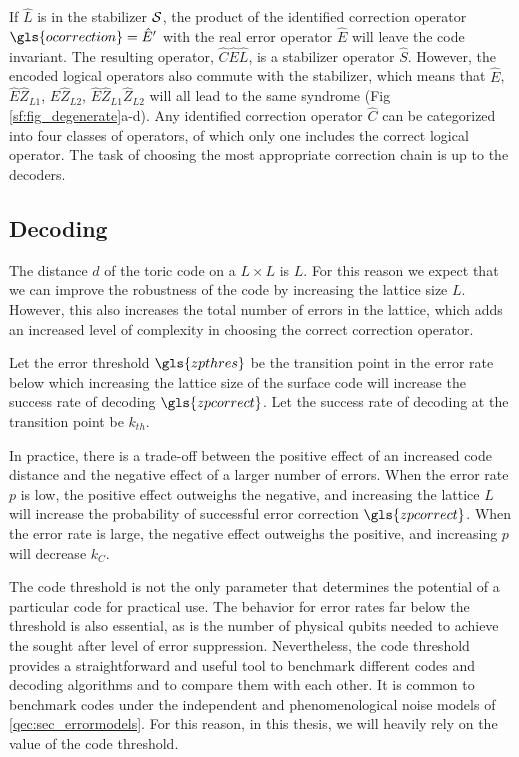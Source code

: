 If $\hat{L}$ is in the stabilizer $\mathcal{S}$, the product of the identified correction operator $\gls{ocorrection}=\hat{E}'$ with the real error operator $\hat{E}$ will leave the code invariant. The resulting operator, $\hat{C}\hat{E}\hat{L}$, is a stabilizer operator $\hat{S}$. However, the encoded logical operators also commute with the stabilizer, which means that $\hat{E}$, $\hat{E}\hat{Z}_{L1}$, $\hat{E}\hat{Z}_{L2}$, $\hat{E}\hat{Z}_{L1}\hat{Z}_{L2}$ will all lead to the same syndrome (Fig \ref{sf:fig_degenerate}a-d). Any identified correction operator $\hat{C}$ can be categorized into four classes of operators, of which only one includes the correct logical operator. The task of choosing the most appropriate correction chain is up to the decoders.

\subsection{Decoding}\label{sec:threshold}
The distance $d$ of the toric code on a $L\times L$ is $L$. For this reason we expect that we can improve the robustness of the code by increasing the lattice size $L$. However, this also increases the total number of errors in the lattice, which adds an increased level of complexity in choosing the correct correction operator.

\begin{definition}\label{def:pthres}
  Let the error threshold $\gls{zpthres}$ be the transition point in the error rate below which increasing the lattice size of the surface code will increase the success rate of decoding $\gls{zpcorrect}$. Let the success rate of decoding at the transition point be $k_{th}$. 
\end{definition}

In practice, there is a trade-off between the positive effect of an increased code distance and the negative effect of a larger number of errors. When the error rate $p$ is low, the positive effect outweighs the negative, and increasing the lattice $L$ will increase the probability of successful error correction $\gls{zpcorrect}$. When the error rate is large, the negative effect outweighs the positive, and increasing $p$ will decrease $k_C$. 

The code threshold is not the only parameter that determines the potential of a particular code for practical use. The behavior for error rates far below the threshold is also essential, as is the number of physical qubits needed to achieve the sought after level of error suppression. Nevertheless, the code threshold provides a straightforward and useful tool to benchmark different codes and decoding algorithms and to compare them with each other. It is common to benchmark codes under the independent and phenomenological noise models of \ref{qec:sec_errormodels}. For this reason, in this thesis, we will heavily rely on the value of the code threshold. 

